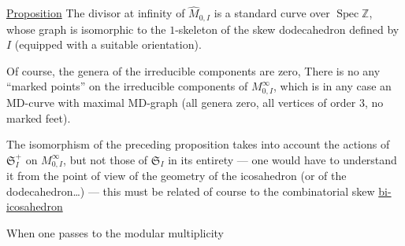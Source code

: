 \uline{Proposition} The divisor at infinity  of $\widehat M_{0,I}$ is a  standard curve over $\operatorname{Spec}\mathbb Z$, whose graph is isomorphic to the  $1$-skeleton of the skew dodecahedron defined by $I$ (equipped with a suitable orientation).

Of course, the genera of the irreducible components are zero, There is no  any ``marked points'' on  the  irreducible components of $M^\infty_{0,I}$, which is in any case an MD-curve  with maximal MD-graph (all genera zero, all vertices of order $3$, no marked feet).

The isomorphism of the preceding proposition takes into account the actions of $\mathfrak S_I^+$  on $M^\infty_{0,I}$, but not those of $\mathfrak S_I$  in its entirety --- one would have to understand it from the point of view of the geometry of the  icosahedron (or of the  dodecahedron\ldots) --- this must be related of course to the combinatorial skew \uline{bi-icosahedron}\unsure{)|]}

When one passes to the modular multiplicity
